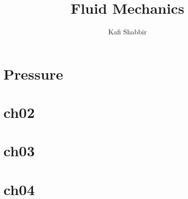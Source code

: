 \documentclass[
	12pt
] {book}
\title{Fluid Mechanics}
\author{Kafi Shabbir}
\begin{document}
	\maketitle
	\tableofcontents
	
	\chapter{Pressure}
		
		
	\chapter{ch02}
		
		
	\chapter{ch03}
		

	\chapter{ch04} 
		
	
\end{document}
